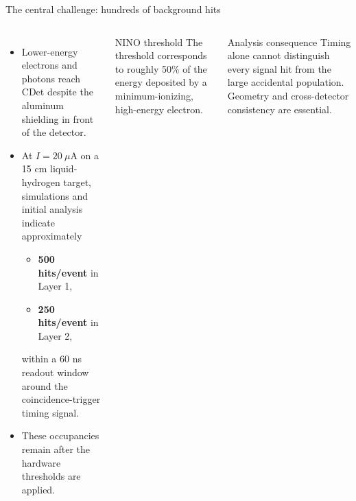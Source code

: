 \documentclass[aspectratio=169,10pt]{beamer}
\begin{document}
\begin{frame}{The central challenge: hundreds of background hits}
\begin{columns}[T,onlytextwidth]
  \begin{itemize}
    \item Lower-energy electrons and photons reach CDet despite the aluminum shielding in front of the detector.
    \item At $I=20~\mu\mathrm{A}$ on a 15 cm liquid-hydrogen target, simulations and initial analysis indicate approximately
      \begin{itemize}
        \item \textbf{500 hits/event} in Layer 1,
        \item \textbf{250 hits/event} in Layer 2,
      \end{itemize}
      within a 60 ns readout window around the coincidence-trigger timing signal.
    \item These occupancies remain after the hardware thresholds are applied.
  \end{itemize}
  \begin{block}{NINO threshold}
    The threshold corresponds to roughly 50\% of the energy deposited by a minimum-ionizing, high-energy electron.
  \end{block}
  \vspace{0.22cm}
  \begin{block}{Analysis consequence}
    Timing alone cannot distinguish every signal hit from the large accidental population. Geometry and cross-detector consistency are essential.
  \end{block}
\end{columns}
\end{frame}
\end{document}
